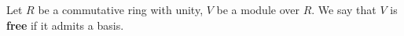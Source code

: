 \begin{definition}
  Let $R$ be a commutative ring with unity, $V$ be a module over $R$.
  We say that $V$ is \textbf{free} if it admits a basis.
\end{definition}
